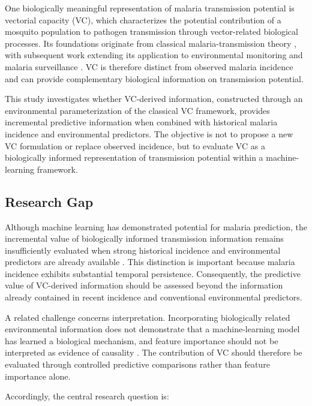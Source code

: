 \documentclass[10pt,twocolumn]{article}
\begin{document}
One biologically meaningful representation of malaria transmission
potential is vectorial capacity (VC), which characterizes the potential
contribution of a mosquito population to pathogen transmission through
vector-related biological processes. Its foundations originate from
classical malaria-transmission theory \parencite{Ross1905,Ross1911a},
with subsequent work extending its application to environmental
monitoring and malaria surveillance \parencite{Ceccato2012}. VC is
therefore distinct from observed malaria incidence and can provide
complementary biological information on transmission potential.

This study investigates whether VC-derived information, constructed
through an environmental parameterization of the classical VC
framework, provides incremental predictive information when combined
with historical malaria incidence and environmental predictors. The
objective is not to propose a new VC formulation or replace observed
incidence, but to evaluate VC as a biologically informed representation
of transmission potential within a machine-learning framework.


\subsection{Research Gap}

Although machine learning has demonstrated potential for malaria
prediction, the incremental value of biologically informed transmission
information remains insufficiently evaluated when strong historical
incidence and environmental predictors are already available
\parencite{Odu2021,Okiring2021,MafweleLee2022,Kaur2022,Mbunge2023}.
This distinction is important because malaria incidence exhibits
substantial temporal persistence. Consequently, the predictive value
of VC-derived information should be assessed beyond the information
already contained in recent incidence and conventional environmental
predictors.

A related challenge concerns interpretation. Incorporating
biologically related environmental information does not demonstrate
that a machine-learning model has learned a biological mechanism, and
feature importance should not be interpreted as evidence of causality
\parencite{FanLiuSun2023,Qiu2022,AlMeslamani2024}. The contribution of
VC should therefore be evaluated through controlled predictive
comparisons rather than feature importance alone.

Accordingly, the central research question is:
\end{document}
